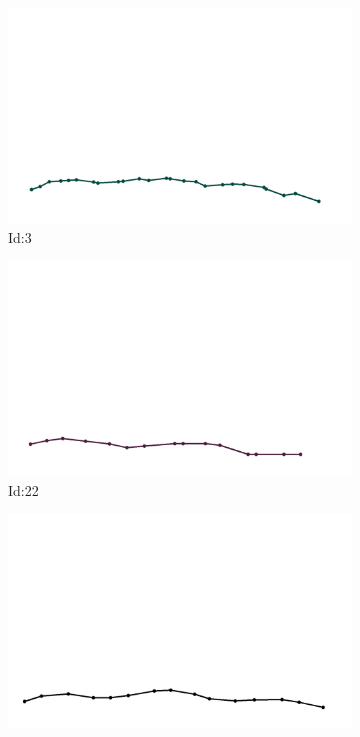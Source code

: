 \documentclass[12pt,twoside]{report}
\begin{document}
\begin{figure}
\centering
\begin{subfigure}[b]{0.20\textwidth}
\centering
\includegraphics[width=\textwidth]{../../trajectories/3.png}
\caption{Id:3}
\end{subfigure}
\begin{subfigure}[b]{0.20\textwidth}
\centering
\includegraphics[width=\textwidth]{../../trajectories/22.png}
\caption{Id:22}
\end{subfigure}
\begin{subfigure}[b]{0.20\textwidth}
\centering
\includegraphics[width=\textwidth]{../../trajectories/483.png}

\end{subfigure}
\end{figure}
\end{document}
